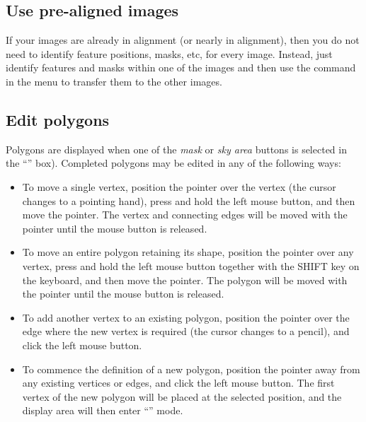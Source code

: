 \subsection {Use pre-aligned images}
If your images are already in alignment (or nearly in alignment), then
you do not need to identify feature positions, masks, etc, for every image.
Instead, just identify features and masks within one of the images and then 
use the  command in the  menu to transfer them to the other images.

\subsection {Edit polygons}
Polygons are displayed when one of the {\em mask} or {\em sky
area} buttons is selected in the ``'' 
box). Completed polygons may be edited in any of the following ways:

\begin{itemize}

\item To move a single vertex, position the pointer over the vertex (the
cursor changes to a pointing hand), press and hold the left mouse button,
and then move the pointer. The vertex and connecting edges will be moved
with the pointer until the mouse button is released.

\item To move an entire polygon retaining its shape, position the pointer
over any vertex, press and hold the left mouse button together with the
SHIFT key on the keyboard, and then move the pointer. The polygon will be
moved with the pointer until the mouse button is released.

\item To add another vertex to an existing polygon, position the pointer
over the edge where the new vertex is required (the cursor changes to a
pencil), and click the left mouse button.

\item To commence the definition of a new polygon, position the pointer
away from any existing vertices or edges, and click the left mouse button.
The first vertex of the new polygon will be placed at the selected
position, and the display area will then enter ``'' mode.

\end{itemize}


